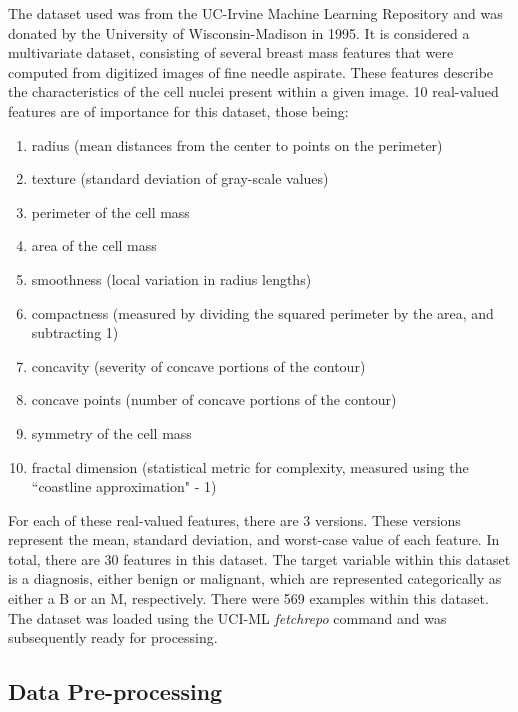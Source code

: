 \documentclass[a4paper]{article}
\begin{document}
The dataset used was from the UC-Irvine Machine Learning Repository and was donated by the University of Wisconsin-Madison in 1995. It is considered a multivariate dataset, consisting of several breast mass features that were computed from digitized images of fine needle aspirate. These features describe the characteristics of the cell nuclei present within a given image. 10 real-valued features are of importance for this dataset, those being:

\begin{enumerate}
    \item radius (mean distances from the center to points on the perimeter)
    \item texture (standard deviation of gray-scale values)
    \item perimeter of the cell mass
    \item area of the cell mass
    \item smoothness (local variation in radius lengths)
    \item compactness (measured by dividing the squared perimeter by the area, and subtracting 1)
    \item concavity (severity of concave portions of the contour)
    \item concave points (number of concave portions of the contour)
    \item symmetry of the cell mass
    \item fractal dimension (statistical metric for complexity, measured using the ``coastline approximation" - 1)
\end{enumerate}

For each of these real-valued features, there are 3 versions. These versions represent the mean, standard deviation, and worst-case value of each feature. In total, there are 30 features in this dataset. The target variable within this dataset is a diagnosis, either benign or malignant, which are represented categorically as either a B or an M, respectively. There were 569 examples within this dataset. The dataset was loaded using the UCI-ML \textit{fetchrepo} command and was subsequently ready for processing. 

\subsection{Data Pre-processing}
\end{document}
